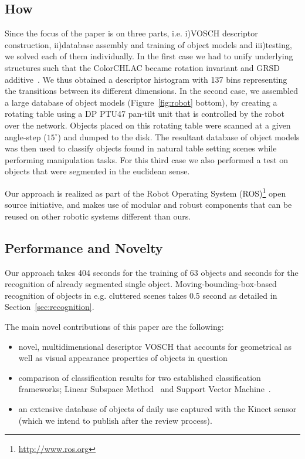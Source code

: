 \documentclass[conference]{sty/IEEEtran}
\begin{document}
\subsection{How}
Since the focus of the paper is on three parts, i.e. i)VOSCH descriptor
construction, ii)database assembly and training of object models and iii)testing,
we solved each of them individually. In the first case we had to unify underlying
structures such that the ColorCHLAC became rotation invariant and GRSD 
additive~\cite{kanezaki2010tvc}. We thus obtained a descriptor histogram with 
137 bins representing the transitions between its different dimensions.
In the second case, we assembled a large database of
object models (Figure~\ref{fig:robot} bottom), by creating a rotating
table using a DP PTU47 pan-tilt unit that is controlled by the robot over the
network. Objects placed on this rotating table were scanned at a given
angle-step ($15^\circ$) and dumped to the disk. The resultant database of
object models was then used to classify objects found in
natural table setting scenes while performing manipulation
tasks. For this third case we also performed a test on objects that were
segmented in the euclidean sense. 

Our approach is realized as part of the Robot Operating System
(ROS)\footnote{\url{http://www.ros.org}} open source initiative, and makes
use of modular and robust components that can be reused on other robotic
systems different than ours.



\subsection{Performance and Novelty}
Our approach takes 404 seconds for the training of 63 objects and  seconds
for the recognition of already segmented single object. Moving-bounding-box-based
recognition of objects in e.g. cluttered scenes takes 0.5 second as detailed
in Section~\ref{sec:recognition}.

The main novel contributions of this paper are the following:
\begin{itemize}
\item novel, multidimensional descriptor VOSCH that accounts for
geometrical as well as visual appearance  properties of objects in question
\item comparison of classification results for two established classification
frameworks; Linear Subspace Method~\cite{watanabe1973} and Support Vector Machine~\cite{svm99}.
\item an extensive database of objects of daily use captured with the Kinect sensor 
(which we intend to publish after the review process).
\end{itemize}
\end{document}
